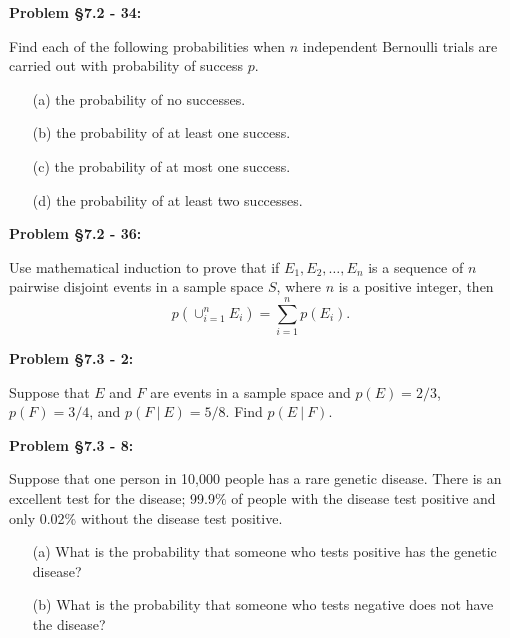 \documentclass{article}
\newenvironment{problem}[1]
    {\begin{mdframed}[default]
    \textbf{Problem #1:}
    }
    {\end{mdframed}
    }
\begin{document}
\begin{problem}{\S 7.2 - 34}
Find each of the following probabilities when $n$ independent Bernoulli trials are carried out with probability of success $p$.
\begin{enumerate}
    \item[(a)] the probability of no successes.
    \item[(b)] the probability of at least one success.
    \item[(c)] the probability of at most one success.
    \item[(d)] the probability of at least two successes.
\end{enumerate}
\end{problem}

\begin{problem}{\S 7.2 - 36}
Use mathematical induction to prove that if $E_1, E_2, \dots, E_n$ is a sequence of $n$ pairwise disjoint events in a sample space $S$, where $n$ is a positive integer, then 
\[ p\left( \cup_{i=1}^n E_i \right) = \sum_{i=1}^n p(E_i).\]
\end{problem}

\begin{problem}{\S 7.3 - 2}
Suppose that $E$ and $F$ are events in a sample space and $p(E) = 2/3$, $p(F) = 3/4$, and $p(F~|~E) = 5/8$. Find $p(E~|~F)$.
\end{problem}

\begin{problem}{\S 7.3 - 8}
Suppose that one person in 10,000 people has a rare genetic disease. There is an excellent test for the disease; 99.9\% of people with the disease test positive and only 0.02\% without the disease test positive.
\begin{itemize}
    \item[(a)] What is the probability that someone who tests positive has the genetic disease?
    \item[(b)] What is the probability that someone who tests negative does not have the disease?
\end{itemize}
\end{problem}
\end{document}
